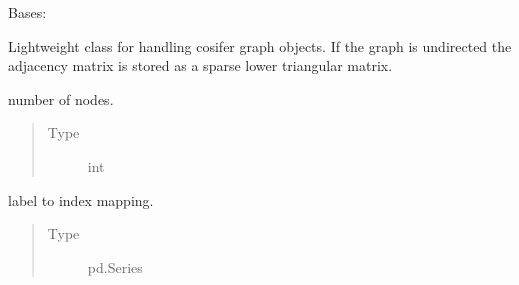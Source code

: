 \documentclass[letterpaper,10pt,english]{sphinxmanual}
\begin{document}
\begin{fulllineitems}
\label{\detokenize{_modules/cosifer.collections:cosifer.collections.graph.Graph}}
Bases: 

Lightweight class for handling cosifer graph objects.
If the graph is undirected the adjacency matrix is stored as a sparse
lower triangular matrix.

\begin{fulllineitems}
\label{\detokenize{_modules/cosifer.collections:cosifer.collections.graph.Graph.n}}
number of nodes.
\begin{quote}\begin{description}
\item[{Type}] \leavevmode
int

\end{description}\end{quote}

\end{fulllineitems}


\begin{fulllineitems}
\label{\detokenize{_modules/cosifer.collections:cosifer.collections.graph.Graph.labels_to_indices}}
label to index mapping.
\begin{quote}\begin{description}
\item[{Type}] \leavevmode
pd.Series

\end{description}\end{quote}

\end{fulllineitems}



\end{fulllineitems}
\end{document}
